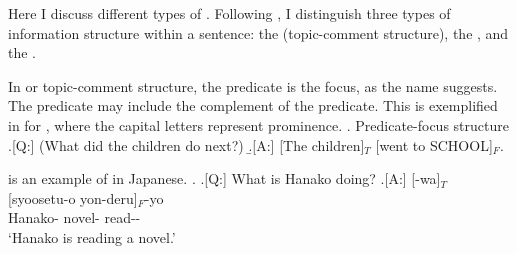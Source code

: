 Here I discuss different types of .
Following ,
I distinguish three types of information structure within a sentence: the  (topic-comment structure), the , and the .

In  or topic-comment structure,
the predicate is the focus, as the name suggests.
The predicate may include the complement of the predicate.
This is exemplified in \Next[A] for ,
where the capital letters represent prominence.
\ex. Predicate-focus structure
	\a.[Q:] (What did the children do next?)
	\b.[A:] [The children]$_{T}$ [went to SCHOOL]$_{F}$.
	\hfill{\cite[][p.\ 121]{lambrecht94}}

\Next[A] is an example of  in Japanese.
%
\ex.
 \a.[Q:] What is Hanako doing?
 \bg.[A:] [-wa]$_{T}$ [syoosetu-o yon-deru]$_{F}$-yo \\
		Hanako- novel- read-- \\
		`Hanako is reading a novel.'

